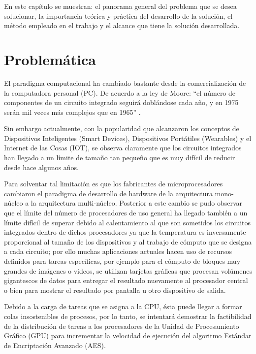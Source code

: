 \documentclass[../main.tex]{subfiles}
\begin{document}
\espacio

  En este capítulo se muestran: el panorama general del problema que se desea solucionar, la importancia teórica y práctica del desarrollo de la solución, el método empleado en el trabajo y el alcance que tiene la solución desarrollada.

  \section{Problemática}

  El paradigma computacional ha cambiado bastante desde la comercialización de la computadora personal (PC). De acuerdo a la ley de Moore: ``el número de componentes de un circuito integrado seguirá doblándose cada año, y en 1975 serán mil veces más complejos que en 1965'' \cite{article:ley_de_moore}.

  Sin embargo actualmente, con la popularidad que alcanzaron los conceptos de Dispositivos Inteligentes (Smart Devices), Dispositivos Portátiles (Wearables) y el Internet de las Cosas (IOT), se observa claramente que los circuitos integrados han llegado a un límite de tamaño tan pequeño que es muy difícil de reducir desde hace algunos años.

  Para solventar tal limitación es que los fabricantes de microprocesadores cambiaron el paradigma de desarrollo de hardware de la arquitectura mono-núcleo a la arquitectura multi-núcleo. Posterior a este cambio se pudo observar que el límite del número de procesadores de uso general ha llegado también a un límite difícil de superar debido al calentamiento al que son sometidos los circuitos integrados dentro de dichos procesadores ya que la temperatura es inversamente proporcional al tamaño de los dispositivos y al trabajo de cómputo que se designa a cada circuito; por ello muchas aplicaciones actuales hacen uso de recursos definidos para tareas específicas, por ejemplo para el cómputo de bloques muy grandes de imágenes o videos, se utilizan tarjetas gráficas que procesan volúmenes gigantescos de datos para entregar el resultado nuevamente al procesador central o bien para mostrar el resultado por pantalla u otro dispositivo de salida.

  Debido a la carga de tareas que se asigna a la CPU, ésta puede llegar a formar colas insostenibles de procesos, por lo tanto, se intentará demostrar la factibilidad de la distribución de tareas a los procesadores de la Unidad de Procesamiento Gráfico (GPU) para incrementar la velocidad de ejecución del algoritmo Estándar de Encriptación Avanzado (AES).
\end{document}

